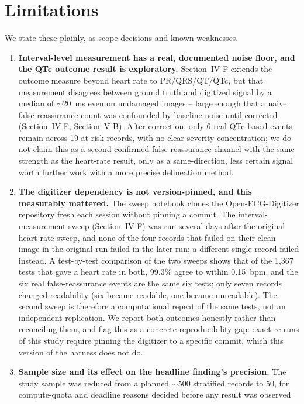 \documentclass[conference]{IEEEtran}
\begin{document}
\section{Limitations}

We state these plainly, as scope decisions and known weaknesses.

\begin{enumerate}
\item \textbf{Interval-level measurement has a real, documented noise floor, and the
QTc outcome result is exploratory.} Section~IV-F extends the outcome measure beyond
heart rate to PR/QRS/QT/QTc, but that measurement disagrees between ground truth and
digitized signal by a median of $\sim$20~ms even on undamaged images -- large enough
that a naive false-reassurance count was confounded by baseline noise until corrected
(Section~IV-F, Section~V-B). After correction, only 6 real QTc-based events remain
across 19 at-risk records, with no clear severity concentration; we do not claim this
as a second confirmed false-reassurance channel with the same strength as the
heart-rate result, only as a same-direction, less certain signal worth further work
with a more precise delineation method.
\item \textbf{The digitizer dependency is not version-pinned, and this measurably
mattered.} The sweep notebook clones the Open-ECG-Digitizer repository fresh each
session without pinning a commit. The interval-measurement sweep (Section~IV-F) was
run several days after the original heart-rate sweep, and none of the four records
that failed on their clean image in the original run failed in the later run; a
different single record failed instead. A test-by-test comparison of the two sweeps
shows that of the 1{,}367 tests that gave a heart rate in both, 99.3\% agree to within
0.15~bpm, and the six real false-reassurance events are the same six tests; only seven
records changed readability (six became readable, one became unreadable). The second
sweep is therefore a computational repeat of the same tests, not an independent
replication. We report both outcomes honestly rather than reconciling them, and flag
this as a concrete reproducibility gap: exact re-runs of
this study require pinning the digitizer to a specific commit, which this version of
the harness does not do.
\item \textbf{Sample size and its effect on the headline finding's precision.} The
study sample was reduced from a planned $\sim$500 stratified records to 50, for
compute-quota and deadline reasons decided before any result was observed

\end{enumerate}
\end{document}
